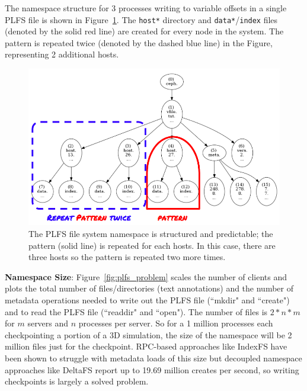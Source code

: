 The namespace structure for 3 processes writing to variable offsets in a single
PLFS file is shown in Figure~\ref{fig:tree_plfs}. The \texttt{host*} directory
and \texttt{data*}/\texttt{index} files (denoted by the solid red line) are
created for every node in the system. The pattern is repeated twice (denoted by
the dashed blue line) in the Figure, representing 2 additional hosts.

\begin{figure}[tb]
\centering
  \includegraphics[width=1\linewidth]{figures/tree_plfs.png} 
  \caption{The PLFS file system namespace is structured and predictable; the
  pattern (solid line) is repeated for each hosts. In this case, there are three
  hosts so the pattern is repeated two more times. 
  }\label{fig:tree_plfs}
\end{figure}

\textbf{Namespace Size}: Figure~\ref{fig:plfs_problem} scales the number of
clients and plots the total number of files/directories (text annotations) and
the number of metadata operations needed to write out the PLFS file (``mkdir"
and ``create") and to read the PLFS file (``readdir" and ``open"). The number
of files is \(2*n*m\) for \(m\) servers and \(n\) processes per server. So for
a 1 million processes each checkpointing a portion of a 3D simulation, the size
of the namespace will be 2 million files just for the checkpoint. RPC-based
approaches like IndexFS have been shown to struggle with metadata loads of this
size but decoupled namespace approaches like DeltaFS report up to 19.69 million
creates per second, so writing checkpoints is largely a solved problem.

